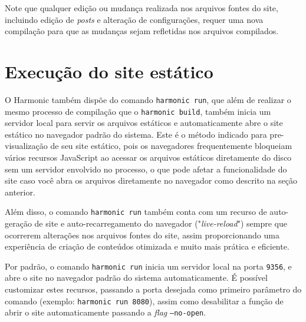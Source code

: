 \documentclass[ppginf, pep]{esinucpel}
\newcommand{\code}[1]{\texttt{#1}}
\begin{document}
Note que qualquer edição ou mudança realizada nos arquivos fontes do site, incluindo edição de \textit{posts} e alteração de configurações, requer uma nova compilação para que as mudanças sejam refletidas nos arquivos compilados.

\section{Execução do site estático}

O Harmonic também dispõe do comando \code{harmonic run}, que além de realizar o mesmo processo de compilação que o \code{harmonic build}, também inicia um servidor local para servir os arquivos estáticos e automaticamente abre o site estático no navegador padrão do sistema. Este é o método indicado para pre-visualização de seu site estático, pois os navegadores frequentemente bloqueiam vários recursos JavaScript ao acessar os arquivos estáticos diretamente do disco sem um servidor envolvido no processo, o que pode afetar a funcionalidade do site caso você abra os arquivos diretamente no navegador como descrito na seção anterior.

Além disso, o comando \code{harmonic run} também conta com um recurso de auto-geração de site e auto-recarregamento do navegador ("\textit{live-reload}") sempre que ocorrerem alterações nos arquivos fontes do site, assim proporcionando uma experiência de criação de conteúdos otimizada e muito mais prática e eficiente.

Por padrão, o comando \code{harmonic run} inicia um servidor local na porta \code{9356}, e abre o site no navegador padrão do sistema automaticamente. É possível customizar estes recursos, passando a porta desejada como primeiro parâmetro do comando (exemplo: \code{harmonic run 8080}), assim como desabilitar a função de abrir o site automaticamente passando a \textit{flag} \code{--no-open}.




% 
\end{document}
